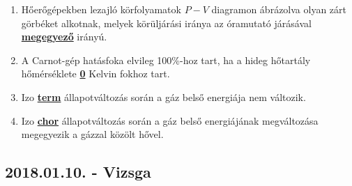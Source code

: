 \documentclass[../../fizika_kerdesek.tex]{subfiles}
\begin{document}
{\begin{enumerate}
                \item Hőerőgépekben lezajló körfolyamatok $P-V$ diagramon ábrázolva olyan zárt görbéket alkotnak, melyek körüljárási iránya az óramutató járásával \underline{\textbf{megegyező}} irányú.
                \item A Carnot-gép hatásfoka elvileg 100\%-hoz tart, ha a hideg hőtartály hőmérséklete \underline{\textbf{0}} Kelvin fokhoz tart.
                \item Izo \underline{\textbf{term}} állapotváltozás során a gáz belső energiája nem változik.
                \item Izo \underline{\textbf{chor}} állapotváltozás során a gáz belső energiájának megváltozása megegyezik a gázzal közölt hővel.
            \end{enumerate}}

    \subsection{2018.01.10. - Vizsga}
\end{document}
